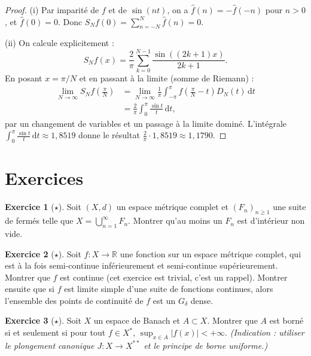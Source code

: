 \documentclass[a4paper,12pt]{book}
\newcommand{\R}{\mathbb{R}}
\newcommand{\dd}{\mathrm{d}}
\newcommand{\abs}[1]{\left| #1 \right|}
\theoremstyle{definition}
\newtheorem{exercice}{Exercice}[chapter]
\theoremstyle{plain}
\theoremstyle{remark}
\begin{document}
\begin{proof}
(i) Par imparité de $f$ et de $\sin(nt)$, on a $\hat{f}(n) = -\hat{f}(-n)$
pour $n > 0$, et $\hat{f}(0) = 0$. Donc $S_N f(0) = \sum_{n=-N}^{N} \hat{f}(n) = 0$.

(ii) On calcule explicitement :
\[
  S_N f(x) = \frac{2}{\pi} \sum_{k=0}^{N-1} \frac{\sin((2k+1)x)}{2k+1}.
\]
En posant $x = \pi/N$ et en passant à la limite (somme de Riemann) :
\begin{align*}
  \lim_{N \to \infty} S_N f\!\left(\frac{\pi}{N}\right)
  &= \lim_{N \to \infty} \frac{1}{\pi}\int_{-\pi}^{\pi} f\!\left(\frac{\pi}{N}-t\right) D_N(t)\, \dd t \\
  &= \frac{2}{\pi} \int_0^{\pi} \frac{\sin t}{t}\, \dd t,
\end{align*}
par un changement de variables et un passage à la limite dominé.
L'intégrale $\int_0^{\pi} \frac{\sin t}{t}\, \dd t \approx 1{,}8519$ donne
le résultat $\frac{2}{\pi} \cdot 1{,}8519 \approx 1{,}1790$.
\end{proof}


\section{Exercices}
\label{sec:exos-ch5}

\begin{exercice}[$\star$]
\label{exo:baire-fermé}
Soit $(X,d)$ un espace métrique complet et $(F_n)_{n \geq 1}$ une suite
de fermés telle que $X = \bigcup_{n=1}^{\infty} F_n$. Montrer qu'au moins
un $F_n$ est d'intérieur non vide.
\end{exercice}

\begin{exercice}[$\star$]
\label{exo:semicontinue-continue}
Soit $f : X \to \R$ une fonction sur un espace métrique complet, qui est
à la fois semi-continue inférieurement et semi-continue supérieurement.
Montrer que $f$ est continue (cet exercice est trivial, c'est un rappel).
Montrer ensuite que si $f$ est limite simple d'une suite de fonctions continues,
alors l'ensemble des points de continuité de $f$ est un $G_\delta$ dense.
\end{exercice}

\begin{exercice}[$\star$]
\label{exo:BS-dual}
Soit $X$ un espace de Banach et $A \subset X$. Montrer que $A$ est borné si et
seulement si pour tout $f \in X^*$, $\sup_{x \in A} \abs{f(x)} < +\infty$.
\textit{(Indication : utiliser le plongement canonique $J : X \to X^{**}$ et
le principe de borne uniforme.)}
\end{exercice}
\end{document}
